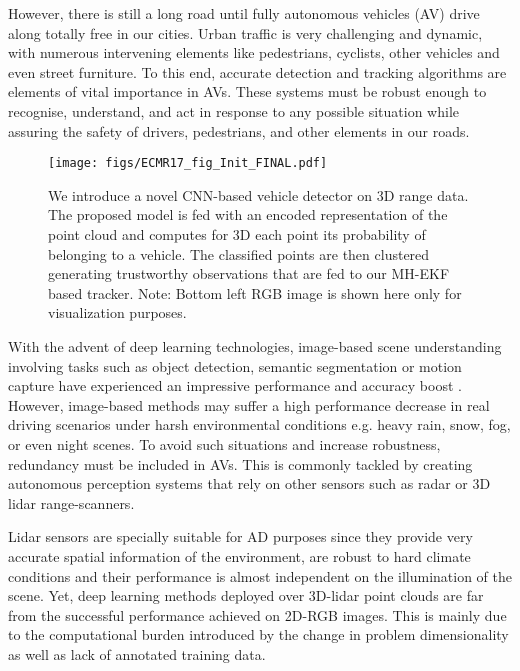 \documentclass[letterpaper, 10 pt, conference]{ieeeconf}  %
\begin{document}
However, there is still a long road until fully autonomous vehicles (AV) drive along totally free in our cities. 
Urban traffic is very challenging and dynamic, with numerous intervening elements like pedestrians, cyclists, other vehicles and even street furniture. 
To this end, accurate detection and tracking algorithms are elements of vital importance in AVs. These systems must be robust enough to recognise, understand, and act in response to any possible situation while assuring the safety of drivers, pedestrians, and other elements in our roads.

\begin{figure}[t]
\centering
 \centerline{
  	\texttt{[image: figs/ECMR17\_fig\_Init\_FINAL.pdf]}}
  
  \caption{We introduce a novel CNN-based vehicle detector on 3D range data. The proposed model is fed with an encoded representation of the point cloud and computes for 3D each point its probability of belonging to a vehicle. 
  The classified points are then clustered generating trustworthy observations that are fed to our MH-EKF based tracker. Note: Bottom left RGB image is shown here only for visualization purposes.
  \vspace{-3mm}} 
  \label{fig:init}
\end{figure}%
With the advent of deep learning technologies, image-based scene understanding involving tasks such as object detection, semantic segmentation or motion capture have experienced an impressive performance and accuracy boost \cite{krizhevsky2012imagenet, ren2015faster, long2015fully, vvaquero2017flow}. However, image-based methods may suffer a high performance decrease in real driving scenarios under harsh environmental conditions e.g. heavy rain, snow, fog, or even night scenes.
To avoid such situations and increase robustness, redundancy must be included in AVs. This is commonly tackled by creating autonomous perception systems that rely on other sensors such as radar or 3D lidar range-scanners. 

Lidar sensors are specially suitable for AD purposes since they provide very accurate spatial information of the environment, are robust to hard climate conditions and their performance is almost independent on the illumination of the scene. 
Yet, deep learning methods deployed over 3D-lidar point clouds are far from the successful performance achieved on 2D-RGB images. This is mainly due to the computational burden introduced by the change in problem dimensionality as well as lack of annotated training data. 
\end{document}

